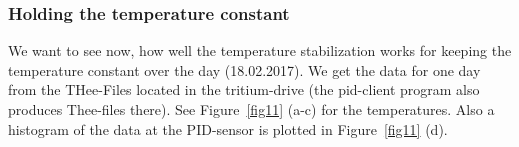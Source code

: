 \documentclass[12pt]{scrartcl}
\begin{document}
      \subsubsection{Holding the temperature constant}
        We want to see now, how well the temperature stabilization works for
        keeping the temperature constant over the day (18.02.2017). We get the
        data for one day from the THee-Files located in the tritium-drive (the
        pid-client program also produces Thee-files there). See
        Figure~\ref{fig11} (a-c) for the temperatures.
        Also a histogram of the data at the PID-sensor is plotted in
        Figure~\ref{fig11} (d).
        \begin{figure}[h!]
          \hspace{-40pt}
          \hspace{-20pt}

\end{figure}
\end{document}
